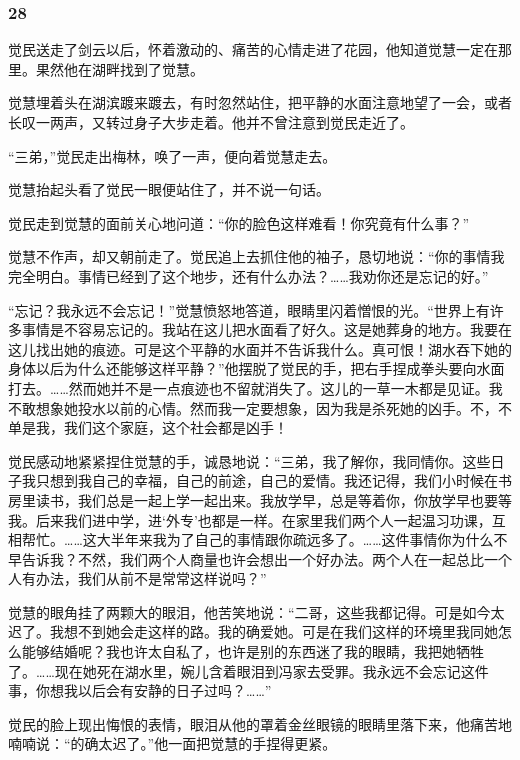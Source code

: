 \subsubsection*{28}

\par 觉民送走了剑云以后，怀着激动的、痛苦的心情走进了花园，他知道觉慧一定在那里。果然他在湖畔找到了觉慧。
\par 觉慧埋着头在湖滨踱来踱去，有时忽然站住，把平静的水面注意地望了一会，或者长叹一两声，又转过身子大步走着。他并不曾注意到觉民走近了。
\par “三弟，”觉民走出梅林，唤了一声，便向着觉慧走去。
\par 觉慧抬起头看了觉民一眼便站住了，并不说一句话。
\par 觉民走到觉慧的面前关心地问道：“你的脸色这样难看！你究竟有什么事？”
\par 觉慧不作声，却又朝前走了。觉民追上去抓住他的袖子，恳切地说：“你的事情我完全明白。事情已经到了这个地步，还有什么办法？……我劝你还是忘记的好。”
\par “忘记？我永远不会忘记！”觉慧愤怒地答道，眼睛里闪着憎恨的光。“世界上有许多事情是不容易忘记的。我站在这儿把水面看了好久。这是她葬身的地方。我要在这儿找出她的痕迹。可是这个平静的水面并不告诉我什么。真可恨！湖水吞下她的身体以后为什么还能够这样平静？”他摆脱了觉民的手，把右手捏成拳头要向水面打去。……然而她并不是一点痕迹也不留就消失了。这儿的一草一木都是见证。我不敢想象她投水以前的心情。然而我一定要想象，因为我是杀死她的凶手。不，不单是我，我们这个家庭，这个社会都是凶手！
\par 觉民感动地紧紧捏住觉慧的手，诚恳地说：“三弟，我了解你，我同情你。这些日子我只想到我自己的幸福，自己的前途，自己的爱情。我还记得，我们小时候在书房里读书，我们总是一起上学一起出来。我放学早，总是等着你，你放学早也要等我。后来我们进中学，进‘外专’也都是一样。在家里我们两个人一起温习功课，互相帮忙。……这大半年来我为了自己的事情跟你疏远多了。……这件事情你为什么不早告诉我？不然，我们两个人商量也许会想出一个好办法。两个人在一起总比一个人有办法，我们从前不是常常这样说吗？”
\par 觉慧的眼角挂了两颗大的眼泪，他苦笑地说：“二哥，这些我都记得。可是如今太迟了。我想不到她会走这样的路。我的确爱她。可是在我们这样的环境里我同她怎么能够结婚呢？我也许太自私了，也许是别的东西迷了我的眼睛，我把她牺牲了。……现在她死在湖水里，婉儿含着眼泪到冯家去受罪。我永远不会忘记这件事，你想我以后会有安静的日子过吗？……”
\par 觉民的脸上现出悔恨的表情，眼泪从他的罩着金丝眼镜的眼睛里落下来，他痛苦地喃喃说：“的确太迟了。”他一面把觉慧的手捏得更紧。
